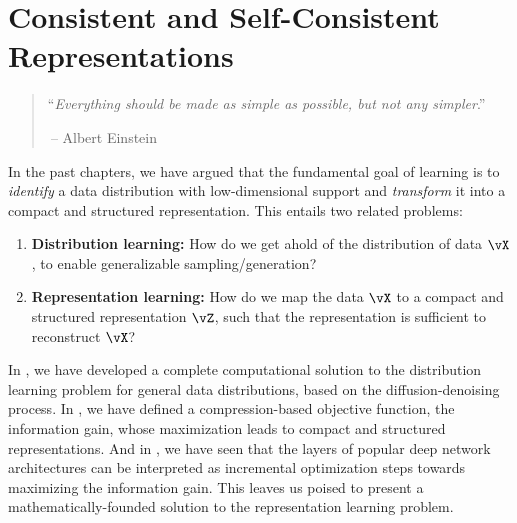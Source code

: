 \documentclass[../../book-main.tex]{subfiles}
\begin{document}
\chapter{Consistent and Self-Consistent Representations}
\label{ch:consistent}\label{ch:autoencoding}
\label{ch:self-consistent}\label{ch:closed-loop}

\begin{quote}
\hfill  ``{\em Everything should be made as simple as possible, but not any simpler}.''

$~$\hfill -- Albert Einstein
\end{quote}



\vspace{5mm}


In the past chapters, we have argued that the fundamental goal of learning is to
\textit{identify} a data distribution with low-dimensional support and
\textit{transform} it into a compact and structured representation. This entails
two related problems:
\begin{enumerate}
  \item \textbf{Distribution learning:} How do we get ahold of the distribution
    of data $\vX$, to enable generalizable sampling/generation?
  \item \textbf{Representation learning:} How do we map the data $\vX$ to
    a compact and structured representation $\vZ$, such that the representation
    is sufficient to reconstruct $\vX$?
\end{enumerate}
In , we have developed a complete computational solution to
the distribution learning problem for general data distributions, based on the
diffusion-denoising process. %
In , we have defined a compression-based objective
function, the information gain, whose maximization leads to compact and
structured representations.
And in , we have seen that the layers of popular deep
network architectures can be interpreted as incremental optimization steps
towards maximizing the information gain. This leaves us poised to present
a mathematically-founded solution to the representation learning problem.
\end{document}
